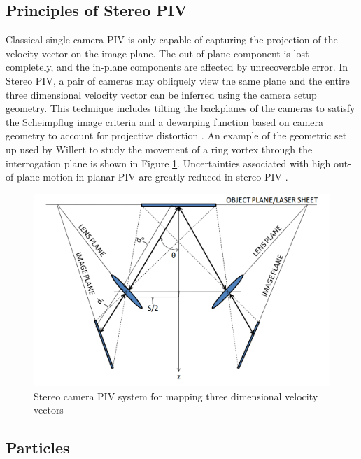 \subsection{Principles of Stereo PIV}

Classical single camera PIV is only capable of capturing the projection of the 
velocity vector on the image plane. The out-of-plane component is lost 
completely, and the in-plane components are affected by unrecoverable error. In 
Stereo PIV, a pair of cameras may obliquely view the same plane and the entire 
three dimensional velocity vector can be inferred using the camera setup 
geometry. This technique 
includes tilting the backplanes of the cameras to satisfy the Scheimpflug image 
criteria and a dewarping function based on camera geometry to account for 
projective distortion \cite{willert1997}. An example of the geometric set up 
used by Willert to study the movement of a ring vortex through the 
interrogation plane is shown in Figure \ref{fig:stereo_piv}. Uncertainties 
associated with high out-of-plane motion in planar PIV are greatly reduced in 
stereo PIV \cite{lawson1997b,lawson1997}.

\begin{figure}[H]
	\centering
	\includegraphics[width=5in]{figs/piv_method/stereo_piv_optics}
	\caption{Stereo camera PIV system for mapping three dimensional velocity 
		vectors}
	\label{fig:stereo_piv}
\end{figure}  

\subsection{Particles}

